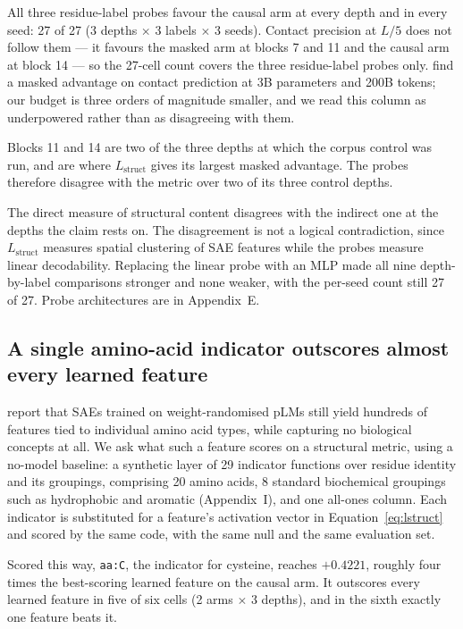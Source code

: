\documentclass{article} %
\newcommand{\red}[1]{\textcolor{red}{#1}}
\newcommand{\opentag}[1]{\textcolor{red}{\textsuperscript{[\ref{#1}]}}}
\newcommand{\pend}[2]{\red{#1}\opentag{#2}}
\renewcommand{\red}[1]{#1}
\renewcommand{\opentag}[1]{}
\renewcommand{\pend}[2]{#1}
\newcommand{\Lstruct}{\ensuremath{L_{\mathrm{struct}}}}
\begin{document}
All three residue-label probes favour the causal arm at every depth and in every seed: 27 of 27 (3
depths $\times$ 3 labels $\times$ 3 seeds). Contact precision at $L/5$ does not follow them --- it
favours the masked arm at blocks 7 and 11 and the causal arm at block 14 --- so the 27-cell count
covers the three residue-label probes only. \citet{cheng2024compute} find a masked advantage on
contact prediction at 3B parameters and 200B tokens; our budget is three orders of magnitude
smaller, and we read this column as underpowered rather than as disagreeing with them.

\pend{Blocks 11 and 14 are two of the three depths at which the corpus control was run, and are
where \Lstruct{} gives its largest masked advantage. The probes therefore disagree with the metric
over two of its three control depths.}{t:probe18}

The direct measure of structural content disagrees with the indirect one at the depths the claim
rests on. The disagreement is not a logical contradiction, since \Lstruct{} measures spatial
clustering of SAE features while the probes measure linear decodability. Replacing the linear
probe with an MLP made all nine depth-by-label comparisons stronger and none weaker, with the
per-seed count still 27 of 27. Probe architectures are in Appendix~E.

\subsection{A single amino-acid indicator outscores almost every learned feature}
\label{sec:indicator}

\citet{simon2025interplm} report that SAEs trained on weight-randomised pLMs still yield hundreds
of features tied to individual amino acid types, while capturing no biological concepts at all. We
ask what such a feature scores on a structural metric, using a no-model baseline: a synthetic layer
of 29 indicator functions over residue identity and its groupings, comprising 20 amino acids, 8
standard biochemical groupings such as hydrophobic and aromatic (Appendix~I), and one all-ones
column. Each indicator is substituted for a feature's activation vector in
Equation~\eqref{eq:lstruct} and scored by the same code, with the same null and the same
evaluation set.

Scored this way, \texttt{aa:C}, the indicator for cysteine, reaches $+0.4221$, roughly four
times the best-scoring learned feature on the causal arm. It outscores every learned feature in
five of six cells (2 arms $\times$ 3 depths), and in the sixth exactly one feature beats it.
\end{document}
